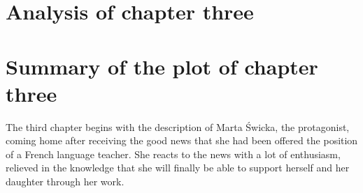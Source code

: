\section{Analysis of chapter three}
\section{Summary of the plot of chapter three}

The third chapter begins with the description of Marta Świcka, the protagonist, coming home after receiving the good news that she had been offered the position of a French language teacher.
She reacts to the news with a lot of enthusiasm, relieved in the knowledge that she will finally be able to support herself and her daughter through her work.
